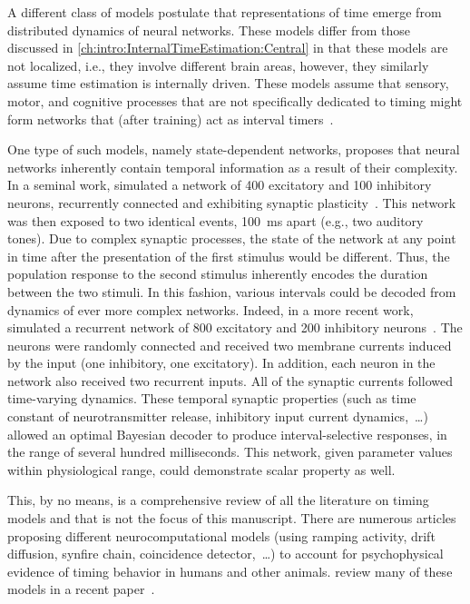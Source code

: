 A different class of models postulate that representations of time emerge from distributed dynamics of neural networks.
These models differ from those discussed in \autoref{ch:intro:InternalTimeEstimation:Central} in that these models are not localized, i.e., they involve different brain areas, however, they similarly assume time estimation is internally driven.
These models assume that sensory, motor, and cognitive processes that are not specifically dedicated to timing might form networks that (after training) act as interval timers~\cite{Wittmann2013NatRevNeurosci}.
\par
One type of such models, namely state-dependent networks, proposes that neural networks inherently contain temporal information as a result of their complexity.
In a seminal work, \citeauthor{Karmarkar2007Neuron} simulated a network of 400 excitatory and 100 inhibitory neurons, recurrently connected and exhibiting synaptic plasticity~\cite{Karmarkar2007Neuron}.
This network was then exposed to two identical events, 100~ms apart (e.g., two auditory tones).
Due to complex synaptic processes, the state of the network at any point in time after the presentation of the first stimulus would be different.
Thus, the population response to the second stimulus inherently encodes the duration between the two stimuli.
In this fashion, various intervals could be decoded from dynamics of ever more complex networks.
Indeed, in a more recent work, \citeauthor{Perez2018JNeurosci} simulated a recurrent network of 800 excitatory and 200 inhibitory neurons~\cite{Perez2018JNeurosci}.
The neurons were randomly connected and received two membrane currents induced by the input (one inhibitory, one excitatory).
In addition, each neuron in the network also received two recurrent inputs.
All of the synaptic currents followed time-varying dynamics.
These temporal synaptic properties (such as time constant of neurotransmitter release, inhibitory input current dynamics,~\ldots) allowed an optimal Bayesian decoder to produce interval-selective responses, in the range of several hundred milliseconds.
This network, given parameter values within physiological range, could demonstrate scalar property as well.
\par
This, by no means, is a comprehensive review of all the literature on timing models and that is not the focus of this manuscript.
There are numerous articles proposing different neurocomputational models (using ramping activity, drift diffusion, synfire chain, coincidence detector,~\ldots) to account for psychophysical evidence of timing behavior in humans and other animals.
 review many of these models in a recent paper~\cite{Paton2018NeuronRev}.


